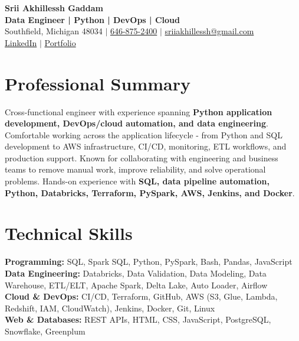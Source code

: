 \documentclass[letterpaper,10pt]{article}
\begin{document}
\fontsize{9.35pt}{10.45pt}\selectfont

\begin{center}
    {\LARGE \textbf{Srii Akhillessh Gaddam}} \\[-1pt]
    \textbf{Data Engineer | Python | DevOps | Cloud} \\[2pt]
    Southfield, Michigan 48034 $|$
    \href{tel:6468752400}{646-875-2400} $|$
    \href{mailto:sriiakhillessh@gmail.com}{sriiakhillessh@gmail.com} \\[1pt]
    \href{https://www.linkedin.com/in/srii-akhiilessh-gaddam-b48668191/}{LinkedIn} $|$
    \href{https://sriiakhillesshg.github.io/portfolio/}{Portfolio}
\end{center}
\vspace{-8pt}

\section{Professional Summary}
\small{Cross-functional engineer with experience spanning \textbf{Python application development, DevOps/cloud automation, and data engineering}. Comfortable working across the application lifecycle - from Python and SQL development to AWS infrastructure, CI/CD, monitoring, ETL workflows, and production support. Known for collaborating with engineering and business teams to remove manual work, improve reliability, and solve operational problems. Hands-on experience with \textbf{SQL, data pipeline automation, Python, Databricks, Terraform, PySpark, AWS, Jenkins, and Docker}.}

\section{Technical Skills}
\small{
\textbf{Programming:} SQL, Spark SQL, Python, PySpark, Bash, Pandas, JavaScript \\
\textbf{Data Engineering:} Databricks, Data Validation, Data Modeling, Data Warehouse, ETL/ELT, Apache Spark, Delta Lake, Auto Loader, Airflow \\
\textbf{Cloud \& DevOps:} CI/CD, Terraform, GitHub, AWS (S3, Glue, Lambda, Redshift, IAM, CloudWatch), Jenkins, Docker, Git, Linux \\
\textbf{Web \& Databases:} REST APIs, HTML, CSS, JavaScript, PostgreSQL, Snowflake, Greenplum
}
\end{document}
